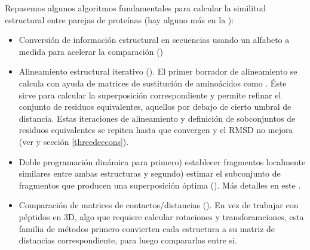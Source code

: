 Repasemos algunos algoritmos fundamentales para calcular la similitud estructural entre parejas de prote\'{i}nas
(hay alguno m\'{a}s en la ):
\begin{itemize}

\item Conversi\'{o}n de informaci\'{o}n estructural en secuencias usando un alfabeto a medida para acelerar la comparaci\'{o}n
()

\item Alineamiento estructural iterativo (). 
El primer borrador de alineamiento se calcula con ayuda de  matrices de sustituci\'{o}n de amino\'{a}cidos como 
. \'{E}ste sirve para calcular la superposici\'{o}n correspondiente y 
permite refinar el conjunto de residuos equivalentes, aquellos por debajo de cierto umbral de distancia.
Estas iteraciones de alineamiento y definici\'{o}n de sobconjuntos de residuos equivalentes se repiten hasta que convergen y 
el RMSD no mejora (ver \citet{Chothia1986} y secci\'{o}n \ref{threedeecons}).

\item Doble programaci\'{o}n din\'{a}mica para primero) establecer fragmentos localmente similares entre ambas estructuras y 
segundo) estimar el subconjunto de fragmentos que producen una superposici\'{o}n \'{o}ptima 
(). 
M\'{a}s detalles en este .


\item Comparaci\'{o}n de matrices de contactos/distancias ().
En vez de trabajar con p\'{e}ptidos en 3D, algo que requiere calcular rotaciones y transforamciones, 
esta familia de m\'{e}todos primero convierten cada estructura a su matriz de distancias correspondiente,
para luego compararlas entre si.



\end{itemize}
